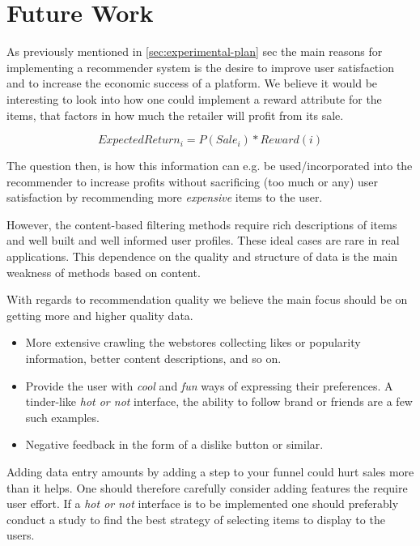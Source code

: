 \clearpage
\section{Future Work}

As previously mentioned in \ref{sec:experimental-plan} sec the main reasons for
implementing a recommender system is the desire to improve user satisfaction
and to increase the economic success of a platform.  We believe it would be
interesting to look into how one could implement a reward attribute for the
items, that factors in how much the retailer will profit from its sale.

\begin{equation}
ExpectedReturn_i = P(Sale_i) * Reward(i)
\end{equation}

The question then, is how this information can e.g. be used/incorporated into
the recommender to increase profits without sacrificing (too much or any) user
satisfaction by recommending more \emph{expensive} items to the user.


However, the content-based filtering methods require rich descriptions of items
and well built and well informed user profiles. These ideal cases are rare in
real applications. This dependence on the quality and structure of data is the
main weakness of methods based on content.

With regards to recommendation quality we believe the main focus should be on
getting more and higher quality data.

\begin{itemize}

\item More extensive crawling the webstores collecting likes or popularity
information, better content descriptions, and so on.

\item Provide the user with \emph{cool} and \emph{fun} ways of expressing their
preferences. A tinder-like \emph{hot or not} interface, the ability to follow
brand or friends are a few such examples.

\item Negative feedback in the form of a dislike button or similar.
\end{itemize}

Adding data entry amounts by adding a step to your funnel could hurt sales more
than it helps. One should therefore carefully consider adding features the
require user effort. If a \emph{hot or not} interface is to be implemented one
should preferably conduct a study to find the best strategy of selecting items
to display to the users.

